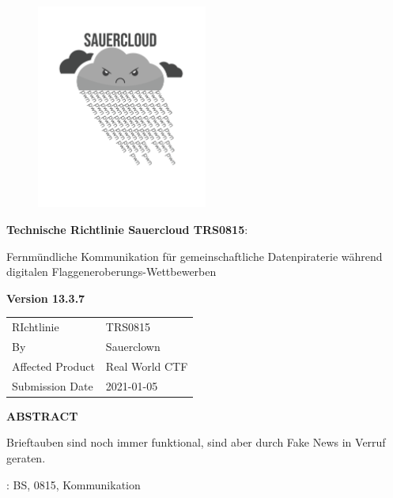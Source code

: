 \documentclass[12pt,a4paper,oneside]{book}
\theoremstyle{plain}
\numberwithin{equation}{chapter} \DeclareMathOperator{\Var}{Var}
\begin{document}
\thispagestyle{empty}

\begin{figure}[h!]
\vskip1in
\begin{center}
\includegraphics[width=0.5\textwidth]{img/sauercloud.png}
\end{center}
\end{figure}
\setlength{\parindent}{0pt}

\large{\textbf{Technische Richtlinie Sauercloud TRS0815}}: 

{{Fernmündliche Kommunikation für gemeinschaftliche Datenpiraterie während digitalen Flaggeneroberungs-Wettbewerben}}


\vskip1.5cm
\begin{center}
\textbf{Version 13.3.7}
\end{center}




\newpage
{}
\begin{table}[h]
	\begin{tabular}{ll}
		RIchtlinie								   & TRS0815  \\
		By							   			& Sauerclown \\
		Affected Product			  				& Real World CTF \\
		Submission Date							& 2021-01-05 \\
	\end{tabular}
\end{table}
\begin{center}
  \large{\textbf{ABSTRACT}}\\
\end{center}
Brieftauben sind noch immer funktional, sind aber durch Fake News in Verruf geraten.


 : BS, 0815, Kommunikation
\end{document}
